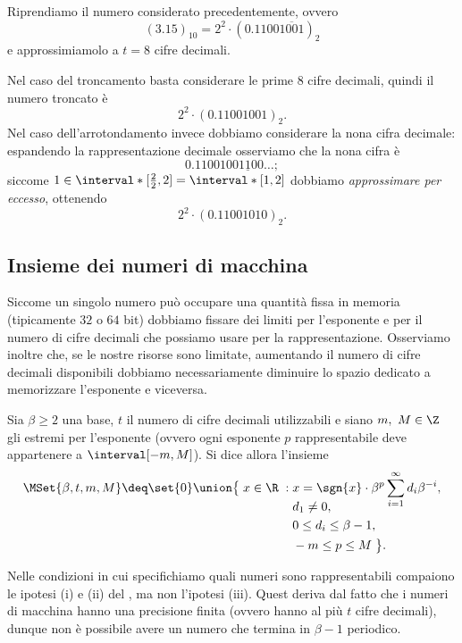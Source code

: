 \begin{example}
    Riprendiamo il numero considerato precedentemente, ovvero \[
        (3.15)_{10} = 2^2 \cdot (0.1100\overline{1001})_2
    \] e approssimiamolo a $t = 8$ cifre decimali.
    
    Nel caso del troncamento basta considerare le prime $8$ cifre decimali, quindi il numero troncato è \[
        2^2 \cdot (0.11001001)_2.
    \] Nel caso dell'arrotondamento invece dobbiamo considerare la nona cifra decimale: espandendo la rappresentazione decimale osserviamo che la nona cifra è \[
        0.11001001\underline100\dots;
    \] siccome $1 \in \interval*[{\frac{2}{2}, 2}] = \interval*[{1, 2}]$ dobbiamo \emph{approssimare per eccesso}, ottenendo \[
        2^2 \cdot (0.11001010)_2.
    \]
\end{example}

\subsection{Insieme dei numeri di macchina}

Siccome un singolo numero può occupare una quantità fissa in memoria (tipicamente $32$ o $64$ bit) dobbiamo fissare dei limiti per l'esponente e per il numero di cifre decimali che possiamo usare per la rappresentazione. 
Osserviamo inoltre che, se le nostre risorse sono limitate, aumentando il numero di cifre decimali disponibili dobbiamo necessariamente diminuire lo spazio dedicato a memorizzare l'esponente e viceversa.

\begin{definition}
    Sia $\beta \geq 2$ una base, $t$ il numero di cifre decimali utilizzabili e siano $m,\ M \in \Z$ gli estremi per l'esponente (ovvero ogni esponente $p$ rappresentabile deve appartenere a $\interval[{-m, M}]$). Si dice allora  l'insieme\[
        \MSet{\beta, t, m, M} \deq \set{0} \union
        \begin{aligned}[t]
            \big\{\; x \in \R \;:\; &x = \sgn{x}\cdot\beta^p\sum_{i=1}^\infty d_i\beta^{-i},\\[-1em]
            &d_1 \neq 0,\\
            &0 \leq d_i \leq \beta-1,\\ 
            &-m \leq p \leq M \;\big\}.
        \end{aligned}
    \] 
\end{definition}

\begin{remark}
    Nelle condizioni in cui specifichiamo quali numeri sono rappresentabili compaiono le ipotesi (i) e (ii) del , ma non l'ipotesi (iii). Quest deriva dal fatto che i numeri di macchina hanno una precisione finita (ovvero hanno al più $t$ cifre decimali), dunque non è possibile avere un numero che termina in $\beta-1$ periodico.
\end{remark}

